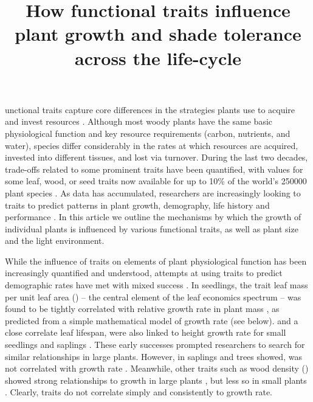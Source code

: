 \documentclass[9pt,twocolumn,twoside,lineno]{pnas-new}
\title{How functional traits influence plant growth and shade tolerance across the life-cycle}
\begin{document}
\verticaladjustment{-2pt}

\maketitle
\thispagestyle{firststyle}


unctional traits capture core differences in the strategies plants use to acquire and invest resources \citep{Westoby-2002, Wright-2004, Chave-2009}. Although most woody plants have the same basic physiological function and key resource requirements (carbon, nutrients, and water), species differ considerably in the rates at which resources are acquired, invested into different tissues, and lost via turnover. During the last two decades, trade-offs related to some prominent traits have been quantified, with values for some leaf, wood, or seed traits now available for up to 10\% of the world's 250000 plant species \citep{Cornwell-2014}. As data has accumulated, researchers are increasingly looking to traits to predict patterns in plant growth, demography, life history and performance \citep{Poorter-2008, Wright-2010, VanKleunen-2010, Adler-2014}. In this article we outline the mechanisms by which the growth of individual plants is influenced by various functional traits, as well as plant size and the light environment.

While the influence of traits on elements of plant physiological function has been increasingly quantified and understood, attempts at using traits to predict demographic rates have met with mixed success \citep{Poorter-2006, Poorter-2008,Wright-2010,Herault-2011,Paine-2015}. In seedlings, the trait leaf mass per unit leaf area ({\lma}) -- the central element of the leaf economics spectrum \citep{Wright-2004} -- was found to be tightly correlated with relative growth rate in plant mass \citep{Lambers-1992, Cornelissen-1996, Wright-2000}, as predicted from a simple mathematical model of growth rate (see below). {\lma} and a close correlate leaf lifespan, were also linked to height growth rate for small seedlings and saplings \citep{Reich-1992, Poorter-2006}. These early successes prompted researchers to search for similar relationships in large plants. However, in saplings and trees showed, {\lma} was not correlated with growth rate \citep{Poorter-2008, Wright-2010, Herault-2011, Paine-2015}. Meanwhile, other traits such as wood density ({\wood}) showed strong relationships to growth in large plants \citep{Wright-2010,Herault-2011}, but less so in small plants \citep{Castro-1998}. Clearly, traits do not correlate simply and consistently to growth rate.
\end{document}
